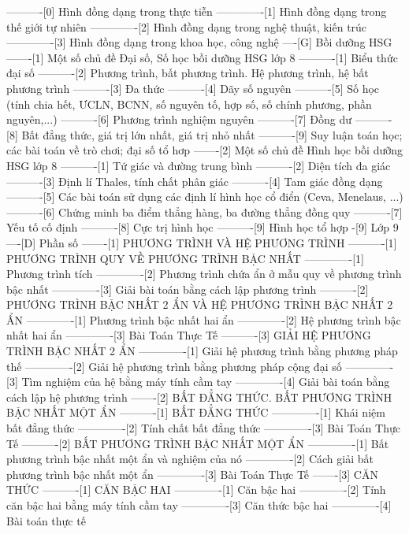 ----------[0] Hình đồng dạng trong thực tiễn
-------------[1] Hình đồng dạng trong thế giới tự nhiên
-------------[2] Hình đồng dạng trong nghệ thuật, kiến trúc
-------------[3] Hình đồng dạng trong khoa học, công nghệ
----[G] Bồi dưỡng HSG
-------[1] Một số chủ đề Đại số, Số học bồi dưỡng HSG lớp 8
----------[1] Biểu thức đại số
----------[2] Phương trình, bất phương trình. Hệ phương trình, hệ bất phương trình
----------[3] Đa thức
----------[4] Dãy số nguyên
----------[5] Số học (tính chia hết, ƯCLN, BCNN, số nguyên tố, hợp số, số chính phương, phần nguyên,...)
----------[6] Phương trình nghiệm nguyên
----------[7] Đồng dư
----------[8] Bất đẳng thức, giá trị lớn nhất, giá trị nhỏ nhất
----------[9] Suy luận toán học; các bài toán về trò chơi; đại số tổ hơp
-------[2] Một số chủ đề Hình học bồi dưỡng HSG lớp 8
----------[1] Tứ giác và đường trung bình
----------[2] Diện tích đa giác
----------[3] Định lí Thales, tính chất phân giác
----------[4] Tam giác đồng dạng
----------[5] Các bài toán sử dụng các định lí hình học cổ điển (Ceva, Menelaus, ...)
----------[6] Chứng minh ba điểm thẳng hàng, ba đường thẳng đồng quy
----------[7] Yếu tố cố định
----------[8] Cực trị hình học
----------[9] Hình học tổ hợp
-[9] Lớp 9
----[D] Phần số
-------[1] PHƯƠNG TRÌNH VÀ HỆ PHƯƠNG TRÌNH
----------[1] PHƯƠNG TRÌNH QUY VỀ PHƯƠNG TRÌNH BẬC NHẤT
-------------[1] Phương trình tích
-------------[2] Phương trình chứa ẩn ở mẫu quy về phương trình bậc nhất
-------------[3] Giải bài toán bằng cách lập phương trình
----------[2] PHƯƠNG TRÌNH BẬC NHẤT 2 ẨN VÀ HỆ PHƯƠNG TRÌNH BẬC NHẤT 2 ẨN
-------------[1] Phương trình bậc nhất hai ẩn
-------------[2] Hệ phương trình bậc nhất hai ẩn
-------------[3] Bài Toán Thực Tế
----------[3] GIẢI HỆ PHƯƠNG TRÌNH BẬC NHẤT 2 ẨN
-------------[1] Giải hệ phương trình bằng phương pháp thế
-------------[2] Giải hệ phương trình bằng phương pháp cộng đại số
-------------[3] Tìm nghiệm của hệ bằng máy tính cầm tay
-------------[4] Giải bài toán bằng cách lập hệ phương trình
-------[2] BẤT ĐẲNG THỨC. BẤT PHƯƠNG TRÌNH BẬC NHẤT MỘT ẨN
----------[1] BẤT ĐẲNG THỨC
-------------[1] Khái niệm bất đẳng thức
-------------[2] Tính chất bất đẳng thức
-------------[3] Bài Toán Thực Tế
----------[2] BẤT PHƯƠNG TRÌNH BẬC NHẤT MỘT ẨN
-------------[1] Bất phương trình bậc nhất một ẩn và nghiệm của nó
-------------[2] Cách giải bất phương trình bậc nhất một ẩn
-------------[3] Bài Toán Thực Tế
-------[3] CĂN THỨC
----------[1] CĂN BẬC HAI
-------------[1] Căn bậc hai
-------------[2] Tính căn bậc hai bằng máy tính cầm tay
-------------[3] Căn thức bậc hai
-------------[4] Bài toán thực tế
